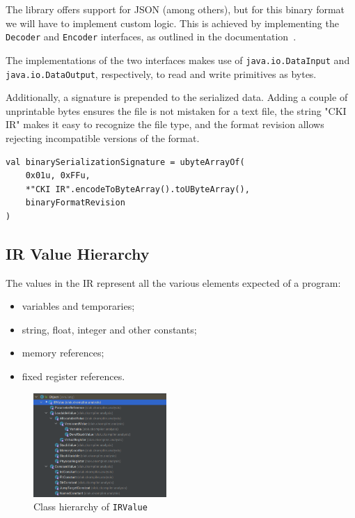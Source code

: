 \documentclass[lettersize,journal]{IEEEtran}
\begin{document}
    The library offers support for JSON (among others), but for this binary format we will have to implement custom
    logic.
    This is achieved by implementing the \texttt{Decoder} and \texttt{Encoder} interfaces, as outlined in the
    documentation~\cite{kotlinx-serialization-custom-format}.

    The implementations of the two interfaces makes use of \texttt{java.io.DataInput} and \texttt{java.io.DataOutput},
    respectively, to read and write primitives as bytes.

    Additionally, a signature is prepended to the serialized data.
    Adding a couple of unprintable bytes ensures the file is not mistaken for a text file, the string "CKI IR" makes it
    easy to recognize the file type, and the format revision allows rejecting incompatible versions of the format.

    \begin{footnotesize}
        \begin{verbatim}
val binarySerializationSignature = ubyteArrayOf(
    0x01u, 0xFFu,
    *"CKI IR".encodeToByteArray().toUByteArray(),
    binaryFormatRevision
)
        \end{verbatim}
    \end{footnotesize}

    \subsection{IR Value Hierarchy}\label{subsec:ir-value-hierarchy}

    The values in the IR represent all the various elements expected of a program:

    \begin{itemize}
        \item variables and temporaries;
        \item string, float, integer and other constants;
        \item memory references;
        \item fixed register references.
    \end{itemize}

    \begin{figure}[th]
        \centering
        \includegraphics[width=0.45\textwidth]{pics/irvalue-hierarchy}
        \caption{Class hierarchy of \texttt{IRValue}}
        \label{fig:irvalue-hierarchy}
    \end{figure}
\end{document}
